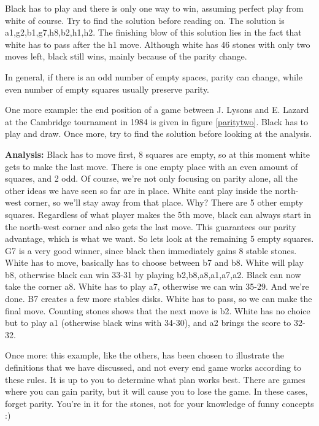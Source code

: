 \documentclass[12pt,twoside]{report}
\begin{document}
Black has to play and there is only one way to win, assuming
perfect play from white of course. Try to find the solution before
reading on. The solution is a1,g2,b1,g7,h8,b2,h1,h2. The finishing
blow of this solution lies in the fact that white has to pass
after the h1 move. Although white has 46 stones with only
two moves left, black still wins, mainly because of the parity
change.

In general, if there is an odd number of empty spaces, parity can
change, while even number of empty squares usually preserve
parity.

One more example: the end position of a game between J. Lysons and
E. Lazard at the Cambridge tournament in 1984 is given in figure
\ref{paritytwo}. Black has to play and draw. Once more, try to
find the solution before looking at the analysis.
\begin{figure}
\paritytwo
\end{figure}

\noindent\textbf{Analysis:} Black has to move first, 8 squares are
empty, so at this moment white gets to make the last move. There
is one empty place with an even amount of squares, and 2 odd. Of
course, we're not only focusing on parity alone, all the other
ideas we have seen so far are in place. White cant play inside the
north-west corner, so we'll stay away from that place. Why? There
are 5 other empty squares. Regardless of what player makes the 5th
move, black can always start in the north-west corner and also
gets the last move. This guarantees our parity advantage, which is
what we want. So lets look at the remaining 5 empty squares. G7 is
a very good winner, since black then immediately gains 8 stable
stones. White has to move, basically has to choose between b7 and
b8. White will play b8, otherwise black can win 33-31 by playing
b2,b8,a8,a1,a7,a2. Black can now take the corner a8. White has to
play a7, otherwise we can win 35-29. And we're done. B7 creates a
few more stables disks. White has to pass, so we can make the
final move. Counting stones shows that the next move is b2. White
has no choice but to play a1 (otherwise black wins with 34-30),
and a2 brings the score to 32-32.

Once more: this example, like the others, has been chosen to illustrate the
definitions that we have discussed, and not every end game works
according
to these rules. It is up to you to determine what plan works best.
There are games where you can gain parity, but it will cause you
to lose the game. In these cases, forget parity. You're in it for
the stones, not for your knowledge of funny concepts :)
\end{document}
